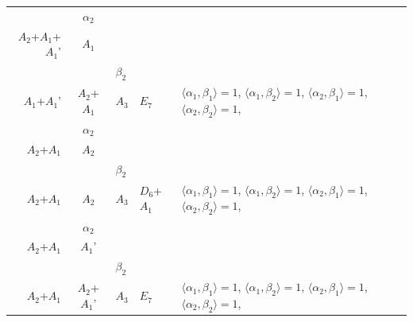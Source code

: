 \documentclass[12pt]{report}
\begin{document}
\begin{appendix}
{\begin{longtable}{rcl p{1cm}p{1cm}p{3cm} }
\\
\begin{tabular}{cc}$\alpha_1$+ & $\alpha_2$\\\tiny{ $A_2$+$A_1$+$A_1$' } & \tiny{ $A_1$ }\end{tabular} &\begin{tabular}{c} = \\~ \end{tabular} & \begin{tabular}{cc}$\beta_1$+ & $\beta_2$\\\tiny{ $A_1$+$A_1$' } & \tiny{ $A_2$+$A_1$ }\end{tabular} & $A_3$ & $E_7$ &  $\langle\alpha_1, \beta_1\rangle=1$, $\langle\alpha_1, \beta_2\rangle=1$, $\langle\alpha_2, \beta_1\rangle=1$, $\langle\alpha_2, \beta_2\rangle=1$, 
\\
\begin{tabular}{cc}$\alpha_1$+ & $\alpha_2$\\\tiny{ $A_2$+$A_1$ } & \tiny{ $A_2$ }\end{tabular} &\begin{tabular}{c} = \\~ \end{tabular} & \begin{tabular}{cc}$\beta_1$+ & $\beta_2$\\\tiny{ $A_2$+$A_1$ } & \tiny{ $A_2$ }\end{tabular} & $A_3$ & $D_6$+$A_1$ &  $\langle\alpha_1, \beta_1\rangle=1$, $\langle\alpha_1, \beta_2\rangle=1$, $\langle\alpha_2, \beta_1\rangle=1$, $\langle\alpha_2, \beta_2\rangle=1$, 
\\
\begin{tabular}{cc}$\alpha_1$+ & $\alpha_2$\\\tiny{ $A_2$+$A_1$ } & \tiny{ $A_1$' }\end{tabular} &\begin{tabular}{c} = \\~ \end{tabular} & \begin{tabular}{cc}$\beta_1$+ & $\beta_2$\\\tiny{ $A_2$+$A_1$ } & \tiny{ $A_2$+$A_1$' }\end{tabular} & $A_3$ & $E_7$ &  $\langle\alpha_1, \beta_1\rangle=1$, $\langle\alpha_1, \beta_2\rangle=1$, $\langle\alpha_2, \beta_1\rangle=1$, $\langle\alpha_2, \beta_2\rangle=1$, 
\\

\end{longtable}}
\end{appendix}
\end{document}
